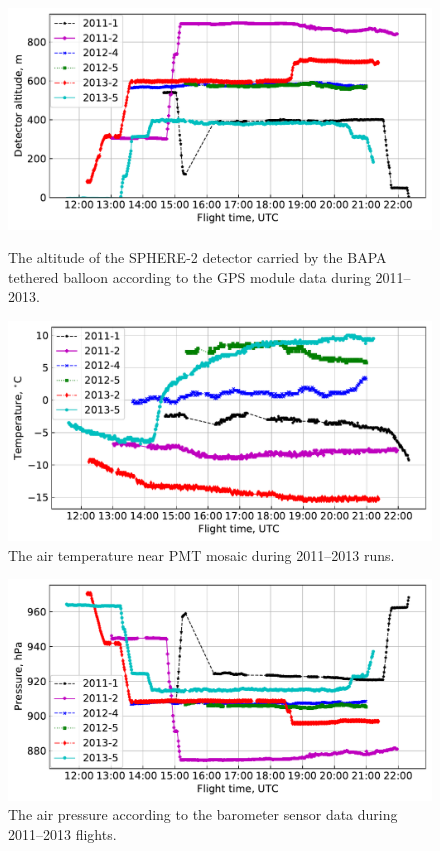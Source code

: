 \documentclass[final,5p,times,twocolumn]{elsarticle}
\begin{document}
\begin{figure}[thb]    
    \begin{minipage}[t]{0.48\textwidth}
    \centering
 \includegraphics[width=\textwidth]{Telemetry_height.pdf}
    \caption{The altitude of the SPHERE-2 detector carried by the BAPA tethered balloon according to the GPS module data during 2011--2013.}
    \label{fig:height}
    
    \end{minipage}
    \hfill
    \begin{minipage}[t]{0.48\textwidth}
    \centering
\includegraphics[width=\textwidth]{Telemetry_tmos.pdf}
    \caption{The air temperature near PMT mosaic during 2011--2013 runs.}
    \label{fig:temperature}
    
    \end{minipage}
\end{figure}

\begin{figure}[tb]
    \includegraphics[width=.48\textwidth]{Telemetry_pressure.pdf}
    \caption{The air pressure according to the barometer sensor data  during 2011--2013 flights.}
    \label{fig:pressure}
\end{figure}
\end{document}
